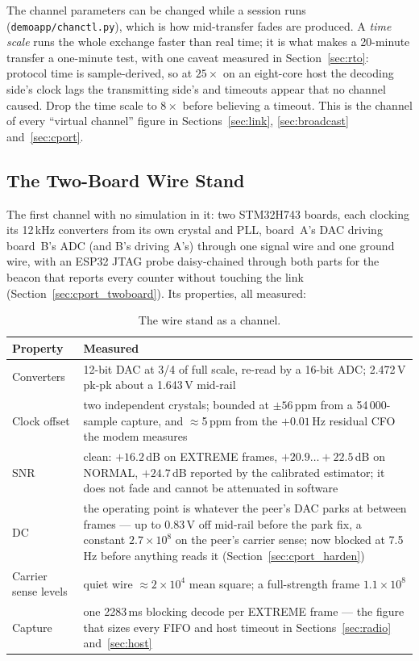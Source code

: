 The channel parameters can be changed while a session runs
(\texttt{demoapp/chanctl.py}), which is how mid-transfer fades are
produced.  A \emph{time scale} runs the whole exchange faster than
real time; it is what makes a 20-minute transfer a one-minute test,
with one caveat measured in Section~\ref{sec:rto}: protocol time is
sample-derived, so at $25\times$ on an eight-core host the decoding
side's clock lags the transmitting side's and timeouts appear that no
channel caused.  Drop the time scale to $8\times$ before believing a
timeout.  This is the channel of every ``virtual channel'' figure in
Sections~\ref{sec:link}, \ref{sec:broadcast} and~\ref{sec:cport}.

\subsection{The Two-Board Wire Stand}
\label{sec:chan_wire}

The first channel with no simulation in it: two STM32H743 boards, each
clocking its 12\,kHz converters from its own crystal and PLL, board~A's
DAC driving board~B's ADC (and B's driving A's) through one signal wire
and one ground wire, with an ESP32 JTAG probe daisy-chained through
both parts for the beacon that reports every counter without touching
the link (Section~\ref{sec:cport_twoboard}).  Its properties, all
measured:

\begin{table}[H]
    \centering
    \caption{The wire stand as a channel.}
    \label{tab:chan_wire}
    \small
    \begin{tabular}{@{}lp{8.6cm}@{}}
    \toprule
    \textbf{Property} & \textbf{Measured} \\
    \midrule
    Converters & 12-bit DAC at 3/4 of full scale, re-read by a 16-bit
        ADC; 2.472\,V pk-pk about a 1.643\,V mid-rail \\
    Clock offset & two independent crystals; bounded at $\pm56$\,ppm
        from a 54\,000-sample capture, and $\approx$5\,ppm from the
        $+0.01$\,Hz residual CFO the modem measures \\
    SNR & clean: $+16.2$\,dB on EXTREME frames, $+20.9\ldots+22.5$\,dB
        on NORMAL, $+24.7$\,dB reported by the calibrated estimator; it
        does not fade and cannot be attenuated in software \\
    DC & the operating point is whatever the peer's DAC parks at
        between frames --- up to 0.83\,V off mid-rail before the park
        fix, a constant $2.7\times10^{8}$ on the peer's carrier
        sense; now blocked at 7.5\,Hz before anything reads it
        (Section~\ref{sec:cport_harden}) \\
    Carrier sense levels & quiet wire $\approx2\times10^{4}$ mean
        square; a full-strength frame $1.1\times10^{8}$ \\
    Capture & one 2283\,ms blocking decode per EXTREME frame --- the
        figure that sizes every FIFO and host timeout in
        Sections~\ref{sec:radio} and~\ref{sec:host} \\
    \bottomrule
    \end{tabular}
\end{table}

